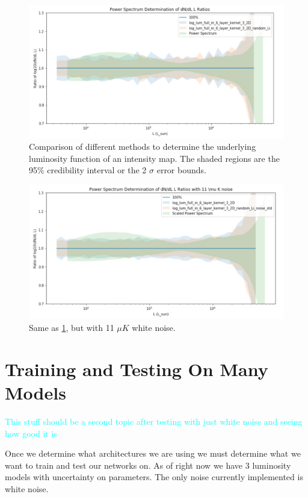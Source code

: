 \documentclass{article}
\newcommand{\dnp}[1]{\textcolor{cyan}{#1}}
\begin{document}
		\begin{figure}[H]
			\centering
			\includegraphics[width=1.2\textwidth]{no_noise_compare.pdf}
			\caption{Comparison of different methods to determine the underlying luminosity function of an intensity map.  The shaded regions are the 95\% credibility interval or the 2 \(\sigma\) error bounds.}
			\label{fig:no_noise_compare}
		\end{figure}

		\begin{figure}[H]
			\centering
			\includegraphics[width=1.2\textwidth]{noise_compare.pdf}
			\caption{Same as \cref{fig:no_noise_compare}, but with 11 \(\mu K\) white noise.}
			\label{fig:noise_compare}
		\end{figure}


	\section{Training and Testing On Many Models} \label{sec:tat}
		\dnp{This stuff should be a second topic after testing with just white noise and seeing how good it is}

		Once we determine what architectures we are using we must determine what we want to train and test our networks on.  As of right now we have 3 luminosity models with uncertainty on parameters.  The only noise currently implemented is white noise.
\end{document}
